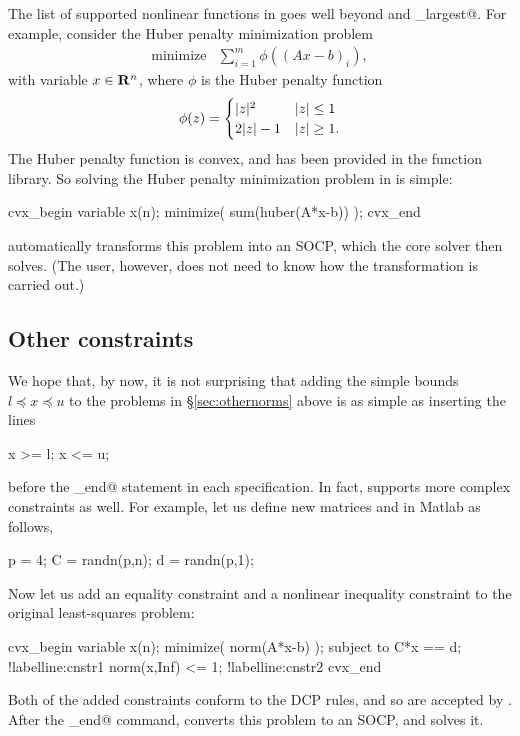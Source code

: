 \documentclass[12pt]{article}
\begin{document}
The list of supported nonlinear functions in \cvx 
goes well beyond \verb@norm@ and \verb@norm_largest@.
For example, consider the Huber penalty minimization problem
\[
	\begin{array}{ll}
		\text{minimize} & \sum_{i=1}^m \phi( (Ax-b)_i ),
	\end{array}
\]
with variable $x \in \mathbf{R}^n$, where $\phi$ is the Huber penalty
function
\[
	\phi(z) =\begin{cases}  |z|^2 & |z|\leq 1 \\ 2|z|-1 & |z|\geq 1. \end{cases}
\]
The Huber penalty function is convex, and has been provided in the \cvx
function library.  So solving the Huber penalty minimization 
problem in \cvx is simple:
\begin{code2}[firstnumber=204]
	cvx_begin
	    variable x(n);
	    minimize( sum(huber(A*x-b)) );
	cvx_end
\end{code2}
\cvx automatically transforms this problem into an SOCP,
which the core solver then solves.
(The \cvx user, however, does not need to know how the transformation is 
carried out.)

\subsection{Other constraints}
\label{sec:constraints}

We hope that, by now, it is not surprising that adding the simple bounds 
$l\preceq x\preceq u$ to the problems in \S\ref{sec:othernorms} above
is as simple as inserting the lines
\begin{code}
	x >= l;
	x <= u;
\end{code}
before the \verb@cvx_end@
statement in each \cvx specification. In fact, 
\cvx supports more complex constraints as well.
For example, let us define new matrices \verb@C@ and \verb@d@ in Matlab
as follows,
\begin{code2}[firstnumber=227]
	p = 4;
	C = randn(p,n);
	d = randn(p,1);
\end{code2}
Now let us add an equality constraint and a nonlinear inequality
constraint to the original least-squares problem:
\begin{code2}[firstnumber=232]
	cvx_begin
	    variable x(n);
	    minimize( norm(A*x-b) );
	    subject to
	        C*x == d;		!label{line:cnstr1}
	        norm(x,Inf) <= 1;	!label{line:cnstr2}
	cvx_end
\end{code2}
Both of the added constraints conform to the DCP rules, and so are accepted
by \cvx.  After the \verb@cvx_end@ command, 
\cvx converts this problem to an SOCP, and solves it.
\end{document}

